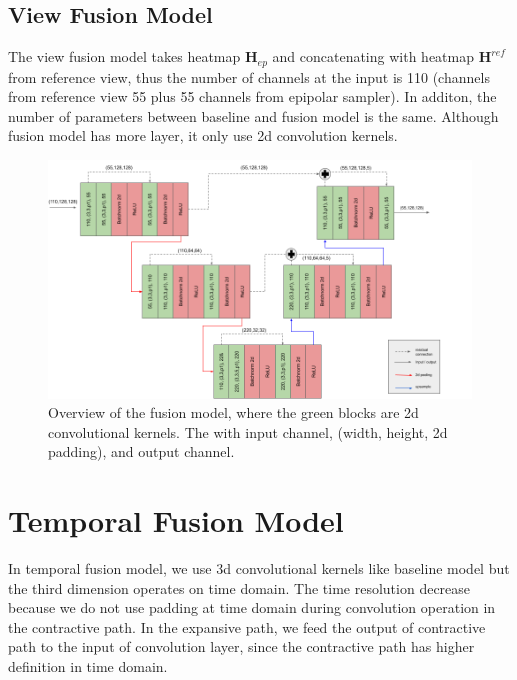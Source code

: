 \subsection{View Fusion Model}
The view fusion model takes heatmap $\mathbf{H}_{ep}$ and concatenating with heatmap $\mathbf{H}^{ref}$ from reference view, thus the number of channels at the input is 110 (channels from reference view 55 plus 55 channels from epipolar sampler). In additon, the number of parameters between baseline and fusion model is the same. Although fusion model has more layer, it only use 2d convolution kernels. 
\begin{figure}
	\centering
	\includegraphics[width=1.0\columnwidth]{figures/ch4/view-fusion.png}
	\caption{Overview of the fusion model, where the green blocks are 2d convolutional kernels. The  with input channel, (width, height, 2d padding), and output channel.}
	\label{fig:view-baseline}
\end{figure}

\section{Temporal Fusion Model}
In temporal fusion model, we use 3d convolutional kernels like baseline model but the third dimension operates on time domain. The time resolution decrease because we do not use padding at time domain during convolution operation in the contractive path. In the expansive path, we feed the output of contractive path to the input of convolution layer, since the contractive path has higher definition in time domain.
